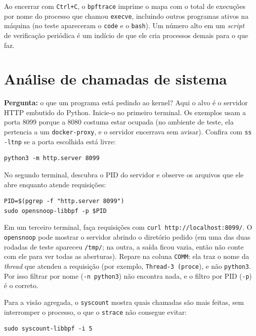 Ao encerrar com \texttt{Ctrl+C}, o \texttt{bpftrace} imprime o mapa com o total de execuções por nome do processo que chamou \texttt{execve}, incluindo outros programas ativos na máquina (no teste apareceram o \texttt{code} e o \texttt{bash}). Um número alto em um \textit{script} de verificação periódica é um indício de que ele cria processos demais para o que faz.

\section{Análise de chamadas de sistema}

\textbf{Pergunta:} o que um programa está pedindo ao kernel? Aqui o alvo é o servidor HTTP embutido do Python. Inicie-o no primeiro terminal. Os exemplos usam a porta 8099 porque a 8080 costuma estar ocupada (no ambiente de teste, ela pertencia a um \texttt{docker-proxy}, e o servidor encerrava sem avisar). Confira com \texttt{ss -ltnp} se a porta escolhida está livre:

\begin{lstlisting}
python3 -m http.server 8099
\end{lstlisting}

No segundo terminal, descubra o PID do servidor e observe os arquivos que ele abre enquanto atende requisições:

\begin{lstlisting}
PID=$(pgrep -f "http.server 8099")
sudo opensnoop-libbpf -p $PID
\end{lstlisting}

Em um terceiro terminal, faça requisições com \texttt{curl http://localhost:8099/}. O \texttt{opensnoop} pode mostrar o servidor abrindo o diretório pedido (em uma das duas rodadas de teste apareceu \texttt{/tmp/}; na outra, a saída ficou vazia, então não conte com ele para ver todas as aberturas). Repare na coluna \texttt{COMM}: ela traz o nome da \textit{thread} que atendeu a requisição (por exemplo, \texttt{Thread-3 (proce}), e não \texttt{python3}. Por isso filtrar por nome (\texttt{-n python3}) não encontra nada, e o filtro por PID (\texttt{-p}) é o correto.

Para a visão agregada, o \texttt{syscount} mostra quais chamadas são mais feitas, sem interromper o processo, o que o \texttt{strace} não consegue evitar:

\begin{lstlisting}
sudo syscount-libbpf -i 5
\end{lstlisting}

